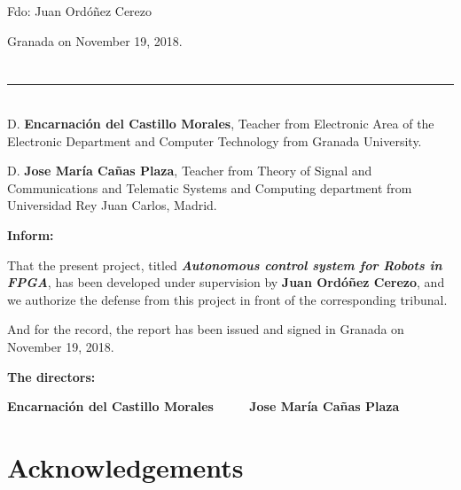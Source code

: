 \vspace{6cm}

\noindent Fdo: Juan Ordóñez Cerezo

\vspace{2cm}

\begin{flushright}
Granada on November 19, 2018.
\end{flushright}


\chapter*{}
\thispagestyle{empty}

\noindent\rule[-1ex]{\textwidth}{2pt}\\[4.5ex]

D. \textbf{Encarnación del Castillo Morales}, Teacher from Electronic Area of the Electronic Department and Computer Technology from Granada University.

\vspace{0.5cm}

D. \textbf{Jose María Cañas Plaza}, Teacher from Theory of Signal and Communications and Telematic Systems and Computing department from Universidad Rey Juan Carlos, Madrid.


\vspace{0.5cm}

\textbf{Inform:}

\vspace{0.5cm}

That the present project, titled \textit{\textbf{Autonomous control system for Robots in FPGA}},
has been developed under supervision by \textbf{Juan Ordóñez Cerezo}, and we authorize the defense from this project in front of the corresponding tribunal.

\vspace{0.5cm}

And for the record, the report has been issued and signed in Granada on November 19, 2018.

\vspace{1cm}

\textbf{The directors:}

\vspace{5cm}

\noindent \textbf{Encarnación del Castillo Morales\ \ \ \ \ Jose María Cañas Plaza}

\chapter*{Acknowledgements}
\thispagestyle{empty}

